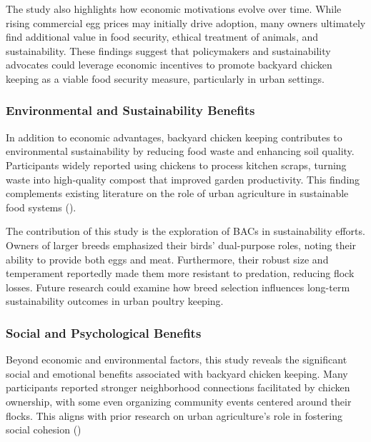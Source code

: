 \documentclass[
  man,
  floatsintext,
  longtable,
  nolmodern,
  notxfonts,
  notimes,
  colorlinks=true,linkcolor=blue,citecolor=blue,urlcolor=blue]{apa7}
\begin{document}
The study also highlights how economic motivations evolve over time.
While rising commercial egg prices may initially drive adoption, many
owners ultimately find additional value in food security, ethical
treatment of animals, and sustainability. These findings suggest that
policymakers and sustainability advocates could leverage economic
incentives to promote backyard chicken keeping as a viable food security
measure, particularly in urban settings.

\subsubsection{Environmental and Sustainability
Benefits}\label{environmental-and-sustainability-benefits}

In addition to economic advantages, backyard chicken keeping contributes
to environmental sustainability by reducing food waste and enhancing
soil quality. Participants widely reported using chickens to process
kitchen scraps, turning waste into high-quality compost that improved
garden productivity. This finding complements existing literature on the
role of urban agriculture in sustainable food systems
().

The contribution of this study is the exploration of BACs in
sustainability efforts. Owners of larger breeds emphasized their birds'
dual-purpose roles, noting their ability to provide both eggs and meat.
Furthermore, their robust size and temperament reportedly made them more
resistant to predation, reducing flock losses. Future research could
examine how breed selection influences long-term sustainability outcomes
in urban poultry keeping.

\subsubsection{Social and Psychological
Benefits}\label{social-and-psychological-benefits}

Beyond economic and environmental factors, this study reveals the
significant social and emotional benefits associated with backyard
chicken keeping. Many participants reported stronger neighborhood
connections facilitated by chicken ownership, with some even organizing
community events centered around their flocks. This aligns with prior
research on urban agriculture's role in fostering social cohesion
()
\end{document}
